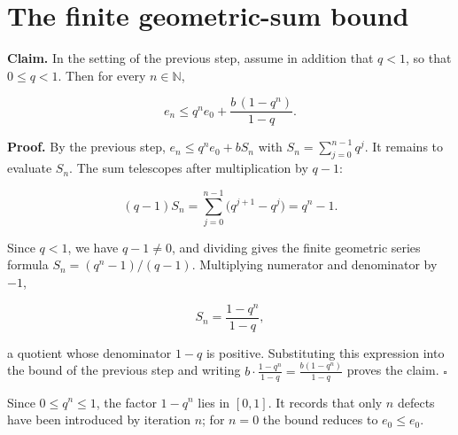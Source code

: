 \documentclass[11pt,a4paper]{article}
\begin{document}
\section{\texorpdfstring{The finite geometric-sum bound}{The finite geometric-sum bound}}


\textbf{Claim.} In the setting of the previous step, assume in addition that \(q<1\), so that \(0\le q<1\). Then for every \(n\in\mathbb N\),


\[e_n\le q^ne_0+\frac{b\,(1-q^n)}{1-q}.\]


\textbf{Proof.} By the previous step, \(e_n\le q^ne_0+bS_n\) with \(S_n=\sum_{j=0}^{n-1}q^j\). It remains to evaluate \(S_n\). The sum telescopes after multiplication by \(q-1\):


\[(q-1)S_n=\sum_{j=0}^{n-1}\bigl(q^{j+1}-q^{j}\bigr)=q^n-1.\]


Since \(q<1\), we have \(q-1\neq0\), and dividing gives the finite geometric series formula \(S_n=(q^n-1)/(q-1)\). Multiplying numerator and denominator by \(-1\),


\[S_n=\frac{1-q^n}{1-q},\]


a quotient whose denominator \(1-q\) is positive. Substituting this expression into the bound of the previous step and writing \(b\cdot\frac{1-q^n}{1-q}=\frac{b(1-q^n)}{1-q}\) proves the claim. \(\square\)




Since \(0\le q^n\le1\), the factor \(1-q^n\) lies in \([0,1]\). It records that only \(n\) defects have been introduced by iteration \(n\); for \(n=0\) the bound reduces to \(e_0\le e_0\).
\end{document}
